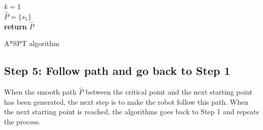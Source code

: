 \begin{algorithm}[H]
\SetAlgoLined
{}
$k =1$ \\
$\hat{P} = \{s_{1}\}$\\
\textup{\textbf{return} $\hat{P}$}

 \caption{A*SPT algorithm}
 \label{alg:astarSPT}
\end{algorithm}

\subsection{Step 5: Follow path and go back to Step 1}
When the smooth path $\hat{P}$ between the critical point and the next starting point has been generated, the next step is to make the robot follow this path. When the next starting point is reached, the algorithms goes back to Step 1 and repeats the process.



